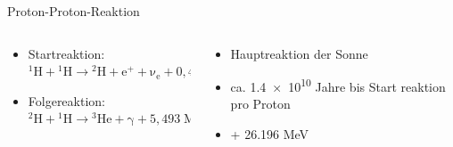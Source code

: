 \documentclass[aspectratio=169,xcolor=dvipsnames,14pt]{beamer}
\begin{document}
    {
    \begin{frame}{Proton-Proton-Reaktion}
        \begin{columns}
            \begin{column}{0.7\textwidth}
                \begin{itemize}
                    \color{LightGrey}
                    \item Startreaktion: \\ \begin{math} {{\displaystyle \mathrm {{}^{1}H+{}^{1}H\to {}^{2}H+e^{+}+\nu _{e}+0{,}42\;MeV} } }    \end{math}
                    \item Folgereaktion: \\ \begin{math}  {\displaystyle \mathrm {{}^{2}H+{}^{1}H\to {}^{3}He+\gamma +5{,}493\;MeV} }    \end{math}
                    


                \end{itemize}
            \end{column}

            \begin{column}{0.3\textwidth}
                \begin{itemize}
                    \color{LightGrey}
                    \item Hauptreaktion der Sonne
                    \item ca. \num{1.4e10} Jahre bis Start reaktion pro Proton
                    \item + \num{26.196} MeV
                \end{itemize}
            \end{column}
        \end{columns}
        

    \end{frame}
    }
\end{document}
